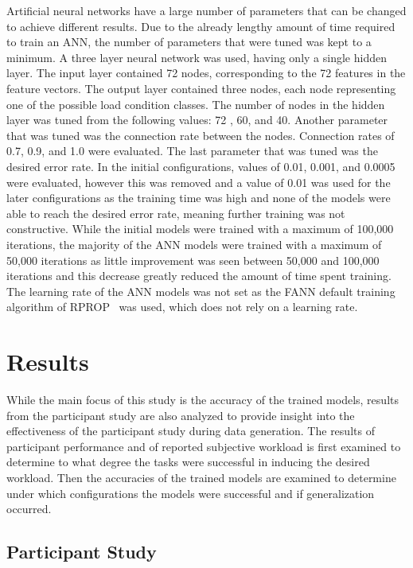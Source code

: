 \documentclass[11pt]{article}
\begin{document}
		Artificial neural networks have a large number of parameters that can be changed to achieve different results. Due to the already lengthy amount of time required to train an ANN, the number of parameters that were tuned was kept to a minimum. A three layer neural network was used, having only a single hidden layer. The input layer contained 72 nodes, corresponding to the 72 features in the feature vectors. The output layer contained three nodes, each node representing one of the possible load condition classes. The number of nodes in the hidden layer was tuned from the following values: 72 , 60, and 40. Another parameter that was tuned was the connection rate between the nodes. Connection rates of 0.7, 0.9, and 1.0 were evaluated. The last parameter that was tuned was the desired error rate. In the initial configurations, values of 0.01, 0.001, and 0.0005 were evaluated, however this was removed and a value of 0.01 was used for the later configurations as the training time was high and none of the models were able to reach the desired error rate, meaning further training was not constructive. While the initial models were trained with a maximum of 100,000 iterations, the majority of the ANN models were trained with a maximum of 50,000 iterations as little improvement was seen between 50,000 and 100,000 iterations and this decrease greatly reduced the amount of time spent training. The learning rate of the ANN models was not set as the FANN default training algorithm of RPROP~\cite{Riedmiller} was used, which does not rely on a learning rate.

\section{Results}
While the main focus of this study is the accuracy of the trained models, results from the participant study are also analyzed to provide insight into the effectiveness of the participant study during data generation. The results of participant performance and of reported subjective workload is first examined to determine to what degree the tasks were successful in inducing the desired workload. Then the accuracies of the trained models are examined to determine under which configurations the models were successful and if generalization occurred. 

	\subsection{Participant Study}
		
\end{document}
